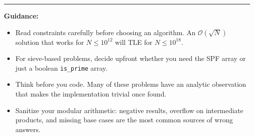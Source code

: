 \documentclass[11pt]{article}
\begin{document}
\hrule
\vspace{1em}

\noindent
\textbf{Guidance:}
\begin{itemize}
    \item Read constraints carefully before choosing an algorithm. An $\mathcal{O}(\sqrt{N})$ solution that works for $N \le 10^{12}$ will TLE for $N \le 10^{18}$.
    \item For sieve-based problems, decide upfront whether you need the SPF array or just a boolean \texttt{is\_prime} array.
    \item Think before you code. Many of these problems have an analytic observation that makes the implementation trivial once found.
    \item Sanitize your modular arithmetic: negative results, overflow on intermediate products, and missing base cases are the most common sources of wrong answers.
\end{itemize}
\end{document}

